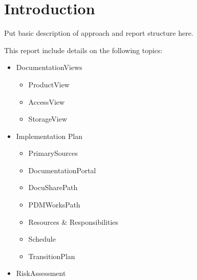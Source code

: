 \section{Introduction}

Put basic description of approach and report structure here.

This report include details on the following topics:

\begin{itemize}

\item DocumentationViews
	\begin{itemize}
	\item ProductView
	\item AccessView
	\item  StorageView
	\end{itemize}
	
\item Implementation Plan
	\begin{itemize}
	\item PrimarySources
	\item DocumentationPortal
	\item DocuSharePath
	\item PDMWorksPath
	\item Resources \& Responsibilities
	\item Schedule
	\item TransitionPlan
	\end{itemize}
	
\item RiskAssessment

\end{itemize}
